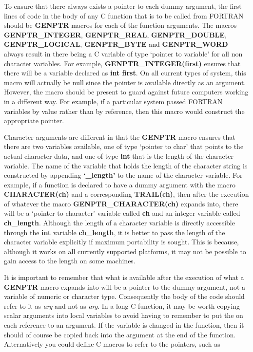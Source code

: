 To ensure that there always exists a pointer to each dummy argument,
the first lines of code in the body of any C function that is to be called from
FORTRAN should be {\bf GENPTR} macros for each of the function arguments. The
macros {\bf GENPTR\_INTEGER}, {\bf GENPTR\_REAL}, {\bf GENPTR\_DOUBLE}, {\bf
GENPTR\_LOGICAL}, {\bf GENPTR\_BYTE} and {\bf GENPTR\_WORD} always result in
there being a C variable of type `pointer to variable' for all non character
variables. For example, {\bf GENPTR\_INTEGER(first)} ensures that there will be
a variable declared as {\bf int {\tt *}first}. On all current types of system,
this macro will actually be null since the pointer is available directly as an
argument. However, the macro should be present to guard against future
computers working in a different way. For example, if a particular system
passed FORTRAN variables by value rather than by reference, then this macro
would construct the appropriate pointer.

Character arguments are different in that the {\bf GENPTR} macro ensures that
there are two variables available, one of type `pointer to char' that points to
the actual character data, and one of type {\bf int} that is the length of the
character variable. The name of the variable that holds the length of the
character string is constructed by appending {\bf `\_length'} to the name of
the character variable. For example, if a function is declared to have a dummy
argument with the macro {\bf CHARACTER(ch)} and a corresponding {\bf
TRAIL(ch)}, then after the execution of whatever the macro {\bf
GENPTR\_CHARACTER(ch)} expands into, there will be a `pointer to character'
variable called {\bf ch} and an integer variable called {\bf ch\_length}.
Although the length of a character variable is directly accessible through the
{\bf int} variable {\bf ch\_length}, it is better to pass the length of the
character variable explicitly if maximum portability is sought. This is
because, although it works on all currently supported platforms, it may not be
possible to gain access to the length on some machines.

It is important to remember that what is available after the execution of what
a {\bf GENPTR} macro expands into will be a pointer to the dummy argument, not a
variable of numeric or character type. Consequently the body of the code should
refer to it as {\tt *}{\em arg} and not as {\em arg}. In a long C function, it
may be worth copying scalar arguments into local variables to avoid having to
remember to put the {\tt *} on each reference to an argument. If the variable
is changed in the function, then it should of course be copied back into the
argument at the end of the function. Alternatively you could define C macros to
refer to the pointers, such as

